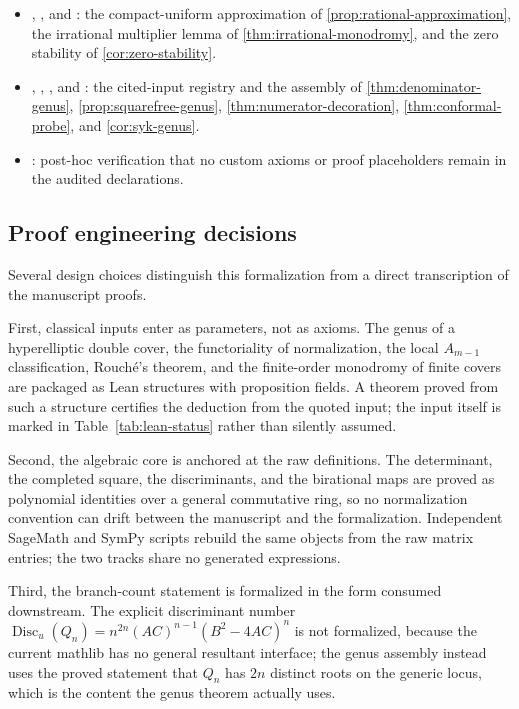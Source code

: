 \documentclass[11pt,reqno]{amsart}
\theoremstyle{remark}
\begin{document}
\begin{itemize}
\item {},
, and : the compact-uniform
approximation of \cref{prop:rational-approximation}, the irrational
multiplier lemma of \cref{thm:irrational-monodromy}, and the zero
stability of \cref{cor:zero-stability}.

\item {}, ,
, and : the cited-input
registry and the assembly of \cref{thm:denominator-genus},
\cref{prop:squarefree-genus}, \cref{thm:numerator-decoration},
\cref{thm:conformal-probe}, and \cref{cor:syk-genus}.

\item {}: post-hoc verification that no custom axioms
or proof placeholders remain in the audited declarations.
\end{itemize}

\subsection{Proof engineering decisions}

Several design choices distinguish this formalization from a direct
transcription of the manuscript proofs.

First, classical inputs enter as parameters, not as axioms.  The genus of
a hyperelliptic double cover, the functoriality of normalization, the
local $A_{m-1}$ classification, Rouch\'e's theorem, and the finite-order
monodromy of finite covers are packaged as Lean structures with
proposition fields.  A theorem proved from such a structure certifies the
deduction from the quoted input; the input itself is marked in
Table~\ref{tab:lean-status} rather than silently assumed.

Second, the algebraic core is anchored at the raw definitions.  The
determinant, the completed square, the discriminants, and the birational
maps are proved as polynomial identities over a general commutative ring,
so no normalization convention can drift between the manuscript and the
formalization.  Independent SageMath and SymPy scripts rebuild the same
objects from the raw matrix entries; the two tracks share no generated
expressions.

Third, the branch-count statement is formalized in the form consumed
downstream.  The explicit discriminant number
$\operatorname{Disc}_u(Q_n)=n^{2n}(AC)^{n-1}(B^2-4AC)^n$ is not
formalized, because the current mathlib has no general resultant
interface; the genus assembly instead uses the proved statement that
$Q_n$ has $2n$ distinct roots on the generic locus, which is the content
the genus theorem actually uses.
\end{document}
